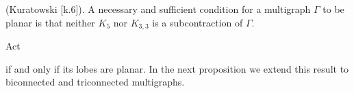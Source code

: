 (Kuratowski [k.6]). A necessary and sufficient condition for a multigraph $\Gamma$ to be planar is that neither $K_5$ nor $K_{3,3}$ is a subcontraction of $\Gamma$.

Act

if and only if its lobes are planar. In the next proposition we extend this result to biconnected and triconnected multigraphs.

